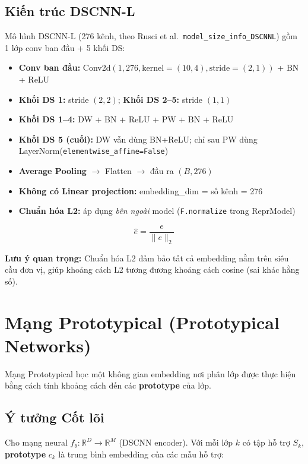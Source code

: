 \documentclass[12pt,a4paper]{report}
\begin{document}
\subsection{Kiến trúc DSCNN-L}

Mô hình DSCNN-L (276 kênh, theo Rusci et al.\ \texttt{model\_size\_info\_DSCNNL})
gồm 1 lớp conv ban đầu + 5 khối DS:

\begin{itemize}
    \item \textbf{Conv ban đầu:} Conv2d$(1, 276, \text{kernel}=(10,4), \text{stride}=(2,1))$ + BN + ReLU
    \item \textbf{Khối DS 1:} stride $(2,2)$; \textbf{Khối DS 2--5:} stride $(1,1)$
    \item \textbf{Khối DS 1--4:} DW + BN + ReLU + PW + BN + ReLU
    \item \textbf{Khối DS 5 (cuối):} DW vẫn dùng BN+ReLU; chỉ sau PW dùng LayerNorm(\texttt{elementwise\_affine=False})
    \item \textbf{Average Pooling} $\rightarrow$ Flatten $\rightarrow$ đầu ra $(B, 276)$
    \item \textbf{Không có Linear projection:} embedding\_dim = số kênh = 276
    \item \textbf{Chuẩn hóa L2:} áp dụng \emph{bên ngoài} model (\texttt{F.normalize} trong ReprModel)
\end{itemize}

\begin{equation}
    \hat{e} = \frac{e}{\|e\|_2}
\end{equation}

\textbf{Lưu ý quan trọng:} Chuẩn hóa L2 đảm bảo tất cả embedding nằm trên
siêu cầu đơn vị, giúp khoảng cách L2 tương đương khoảng cách cosine (sai khác
hằng số).


\section{Mạng Prototypical (Prototypical Networks)}
\label{sec:protonet_vi}

Mạng Prototypical học một không gian embedding nơi phân lớp được thực hiện
bằng cách tính khoảng cách đến các \textbf{prototype} của lớp.

\subsection{Ý tưởng Cốt lõi}

Cho mạng neural $f_\theta : \mathbb{R}^D \rightarrow \mathbb{R}^M$ (DSCNN
encoder). Với mỗi lớp $k$ có tập hỗ trợ $S_k$, \textbf{prototype} $c_k$
là trung bình embedding của các mẫu hỗ trợ:
\end{document}
